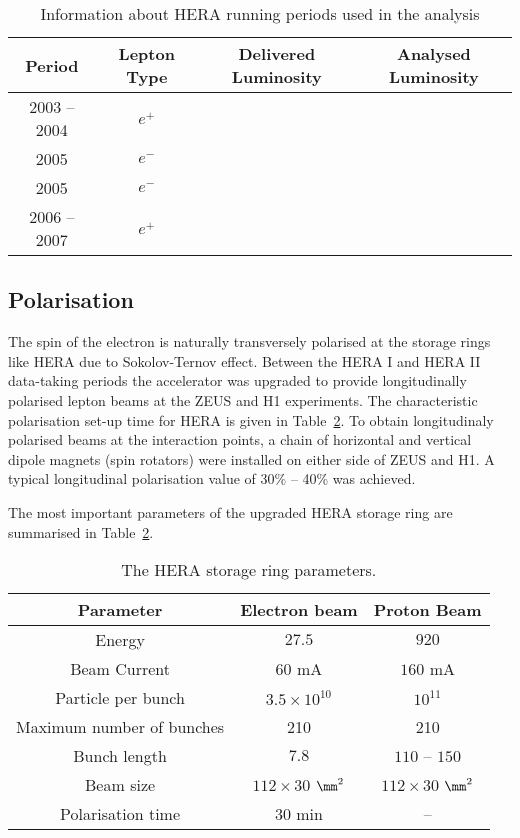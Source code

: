 \begin{table}
	\centering
		\begin{tabular}[h]{|c|c|c|c|}
		  \hline
			Period & Lepton Type & Delivered Luminosity & Analysed Luminosity \\
			\hline \hline
			2003 -- 2004 & $e^{+}$  &   & \\
			2005           & $e^{-}$   &   & \\
			2005           & $e^{-}$   &   & \\
			2006 -- 2007 & $e^{+}$  &   & \\
			\hline
		\end{tabular}
	\caption{Information about HERA running periods used in the analysis}
	\label{tab:heraruns}
\end{table}

\subsection{Polarisation}
\label{subsec:polarisation}
The spin of the electron is naturally transversely polarised at the storage rings like HERA due to Sokolov-Ternov effect. Between the HERA I and HERA II data-taking periods the accelerator was upgraded to provide longitudinally polarised lepton beams at the ZEUS and H1 experiments. The characteristic polarisation set-up time for HERA is given in Table~\ref{tab:HERAParameters}. To obtain longitudinaly polarised beams at the interaction points, a chain of horizontal and vertical dipole magnets (spin rotators) were installed on either side of ZEUS and H1. A typical longitudinal polarisation value of 30\% -- 40\% was achieved.

 The most important parameters of the upgraded HERA storage ring are summarised in Table~\ref{tab:HERAParameters}.
\begin{table}[htbp]
	\centering
		\begin{tabular}[h]{|c|c|c|}
			\hline
			Parameter       & Electron beam   & Proton Beam \\
			\hline \hline
			Energy            &     $27.5$ \GeV  & $920$ \GeV \\
			Beam Current  &     $60$ mA       & $160$ mA \\
			Particle per bunch & $3.5\times 10^{10}$ & $10^{11}$ \\
			Maximum number of bunches & 210 & 210 \\
			Bunch length &  $7.8$ \mm & $110$ -- $150$ \mm \\
			Beam size     &  $112\times 30$ $\mm^2$ & $112\times 30$ $\mm^2$ \\
			Polarisation time & $30$ min & -- \\
			\hline
		\end{tabular}
	\caption{The HERA storage ring parameters.}
	\label{tab:HERAParameters}
\end{table}


